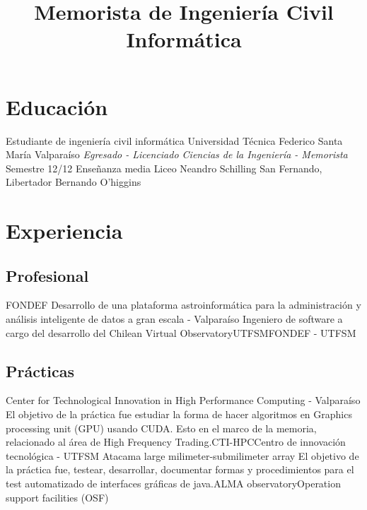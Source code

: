 \documentclass[11pt,a4paper]{moderncv}
\title{Memorista de Ingeniería Civil Informática}
\begin{document}
\maketitle

\section{Educación}
	{Estudiante de ingeniería civil informática}
	{Universidad Técnica Federico Santa María}
	{Valparaíso}
	{\emph{Egresado - Licenciado Ciencias de la Ingeniería - Memorista}}
	{Semestre 12/12}
	{Enseñanza media}
	{Liceo Neandro Schilling}
	{San Fernando, Libertador Bernando O'higgins}
	{}{}

\section{Experiencia}
\subsection{Profesional}
	{FONDEF Desarrollo de una plataforma astroinformática para la administración y análisis inteligente de datos a gran escala - Valparaíso}
	{Ingeniero de software a cargo del desarrollo del Chilean Virtual Observatory}{UTFSM}{FONDEF - UTFSM}{}

\subsection{Prácticas}
	{Center for Technological Innovation in High Performance Computing - Valparaíso}
	{El objetivo de la práctica fue estudiar la forma de hacer algoritmos en Graphics processing unit (GPU) usando CUDA. Esto en el marco
	de la memoria, relacionado al área de High Frequency Trading.}{CTI-HPC}{Centro de innovación tecnológica - UTFSM}{}
	{Atacama large milimeter-submilimeter array}
	{El objetivo de la práctica fue, testear, desarrollar, documentar formas y procedimientos para el test automatizado de 
	interfaces gráficas de java.}{ALMA observatory}{Operation support facilities (OSF)}{}
\end{document}
